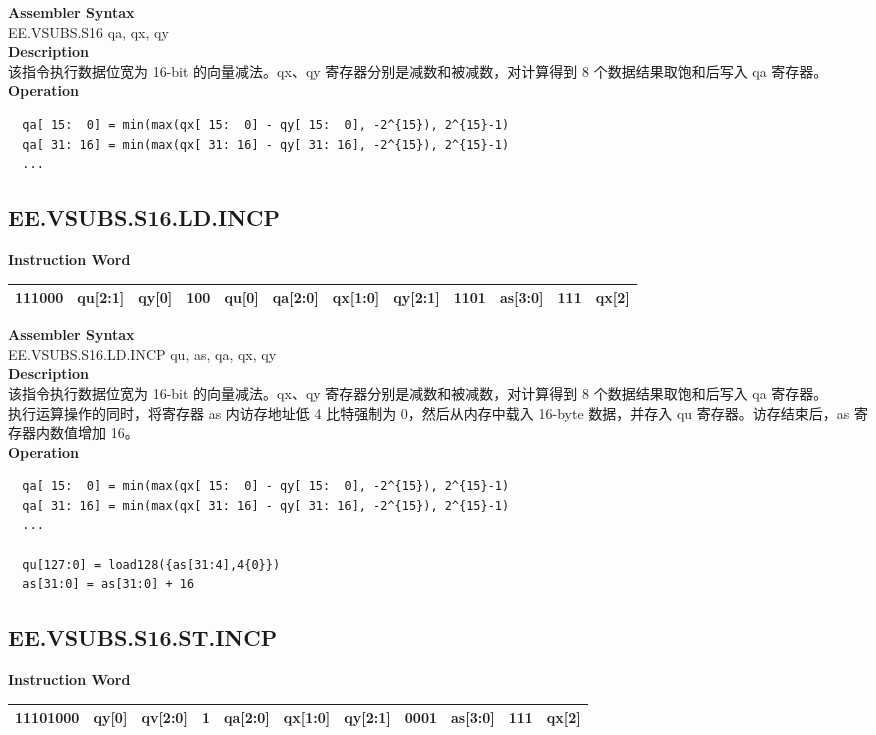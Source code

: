 \textbf{Assembler Syntax} \\
EE.VSUBS.S16 qa, qx, qy \\
\textbf{Description} \\
该指令执行数据位宽为 16-bit 的向量减法。qx、qy 寄存器分别是减数和被减数，对计算得到 8 个数据结果取饱和后写入 qa 寄存器。\\
\textbf{Operation}
\begin{lstlisting}
  qa[ 15:  0] = min(max(qx[ 15:  0] - qy[ 15:  0], -2^{15}), 2^{15}-1)
  qa[ 31: 16] = min(max(qx[ 31: 16] - qy[ 31: 16], -2^{15}), 2^{15}-1)
  ...
\end{lstlisting}

\clearpage
\subsection{EE.VSUBS.S16.LD.INCP}\label{instruction:EEVSUBSS16LDINCP}
\setlength\tabcolsep{6pt}
\textbf{Instruction Word} \\
\begin{tabular}{|c|c|c|c|c|c|c|c|c|c|c|c|}
	\hline
	111000 & qu[2:1] & qy[0] & 100 & qu[0] & qa[2:0] & qx[1:0] & qy[2:1] & 1101 & as[3:0] & 111 & qx[2] \\
	\hline
\end{tabular}

\textbf{Assembler Syntax} \\
EE.VSUBS.S16.LD.INCP qu, as, qa, qx, qy \\
\textbf{Description} \\
该指令执行数据位宽为 16-bit 的向量减法。qx、qy 寄存器分别是减数和被减数，对计算得到 8 个数据结果取饱和后写入 qa 寄存器。\\ 执行运算操作的同时，将寄存器 as 内访存地址低 4 比特强制为 0，然后从内存中载入 16-byte 数据，并存入 qu 寄存器。访存结束后，as 寄存器内数值增加 16。\\
\textbf{Operation}
\begin{lstlisting}
  qa[ 15:  0] = min(max(qx[ 15:  0] - qy[ 15:  0], -2^{15}), 2^{15}-1)
  qa[ 31: 16] = min(max(qx[ 31: 16] - qy[ 31: 16], -2^{15}), 2^{15}-1)
  ...

  qu[127:0] = load128({as[31:4],4{0}})
  as[31:0] = as[31:0] + 16
\end{lstlisting}

\clearpage
\subsection{EE.VSUBS.S16.ST.INCP}\label{instruction:EEVSUBSS16STINCP}
\setlength\tabcolsep{6pt}
\textbf{Instruction Word} \\
\begin{tabular}{|c|c|c|c|c|c|c|c|c|c|c|}
	\hline
	11101000 & qy[0] & qv[2:0] & 1 & qa[2:0] & qx[1:0] & qy[2:1] & 0001 & as[3:0] & 111 & qx[2] \\
	\hline
\end{tabular}

